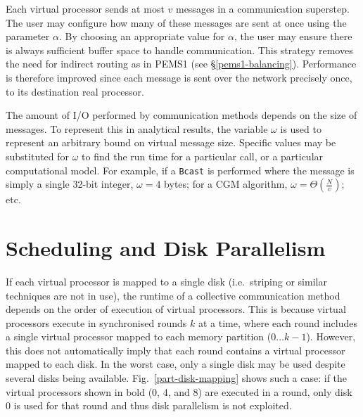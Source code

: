 \documentclass[12pt]{carletoncsthesis}
\begin{document}
Each virtual processor sends at most $v$ messages in a communication superstep.
The user may configure how many of these messages are sent at once using
the parameter $\alpha$.  By choosing an appropriate value for $\alpha$,
the user may ensure there is always sufficient buffer space to handle
communication.  This strategy removes the need for indirect routing as in
PEMS1 (see \S\ref{pems1-balancing}).  Performance is therefore improved since
each message is sent over the network precisely once, to its destination
real processor.

The amount of I/O performed by communication methods depends on the
size of messages.  To represent this in analytical results, the variable
$\omega$ is used to represent an arbitrary bound on virtual message size.
Specific values may be substituted for $\omega$ to find the run time for
a particular call, or a particular computational model.  For example, if a
{\tt Bcast} is performed where the message is simply a single 32-bit integer,
$\omega = 4$ bytes; for a CGM algorithm, $\omega = \Theta(\frac{N}{v})$; etc.


\section{Scheduling and Disk Parallelism}
\label{sched-par}


If each virtual processor is mapped to a single disk (i.e.\ striping or similar
techniques are not in use), the runtime of a collective communication method
depends on the order of execution of virtual processors.  This is because
virtual processors execute in synchronised rounds $k$ at a time, where each
round includes a single virtual processor mapped to each memory partition
($0{\ldots}k-1$).  However, this does not automatically imply that each round
contains a virtual processor mapped to each disk.  In the worst case,
only a single disk may be used despite several disks being available.
Fig.~\ref{part-disk-mapping} shows such a case: if the virtual processors
shown in bold (0, 4, and 8) are executed in a round, only disk 0 is used
for that round and thus disk parallelism is not exploited.
\end{document}
